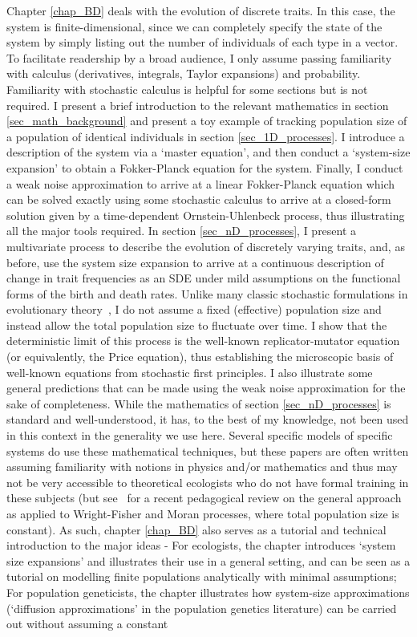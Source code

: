 Chapter \ref{chap_BD} deals with the evolution of discrete traits. In this case, the system is finite-dimensional, since we can completely specify the state of the system by simply listing out the number of individuals of each type in a vector. To facilitate readership by a broad audience, I only assume passing familiarity with calculus (derivatives, integrals, Taylor expansions) and probability. Familiarity with stochastic calculus is helpful for some sections but is not required. I present a brief introduction to the relevant mathematics in section \ref{sec_math_background} and present a toy example of tracking population size of a population of identical individuals in section \ref{sec_1D_processes}. I introduce a description of the system via a `master equation', and then conduct a `system-size expansion' to obtain a Fokker-Planck equation for the system. Finally, I conduct a weak noise approximation to arrive at a linear Fokker-Planck equation which can be solved exactly using some stochastic calculus to arrive at a closed-form solution given by a time-dependent Ornstein-Uhlenbeck process, thus illustrating all the major tools required. In section \ref{sec_nD_processes}, I present a multivariate process to describe the evolution of discretely varying traits, and, as before, use the system size expansion to arrive at a continuous description of change in trait frequencies as an SDE under mild assumptions on the functional forms of the birth and death rates. Unlike many classic stochastic formulations in evolutionary theory~\citep{fisher_genetical_1930,wright_evolution_1931,moran_random_1958,crow_introduction_1970, lande_natural_1976}, I do not assume a fixed (effective) population size and instead allow the total population size to fluctuate over time. I show that the deterministic limit of this process is the well-known replicator-mutator equation (or equivalently, the Price equation), thus establishing the microscopic basis of well-known equations from stochastic first principles. I also illustrate some general predictions that can be made using the weak noise approximation for the sake of completeness. While the mathematics of section \ref{sec_nD_processes} is standard and well-understood, it has, to the best of my knowledge, not been used in this context in the generality we use here. Several specific models of specific systems do use these mathematical techniques, but these papers are often written assuming familiarity with notions in physics and/or mathematics and thus may not be very accessible to theoretical ecologists who do not have formal training in these subjects (but see~\cite{czuppon_understanding_2021} for a recent pedagogical review on the general approach as applied to Wright-Fisher and Moran processes, where total population size is constant). As such, chapter \ref{chap_BD} also serves as a tutorial and technical introduction to the major ideas - For ecologists, the chapter introduces `system size expansions' and illustrates their use in a general setting, and can be seen as a tutorial on modelling finite populations analytically with minimal assumptions; For population geneticists, the chapter illustrates how system-size approximations (`diffusion approximations' in the population genetics literature) can be carried out without assuming a constant 